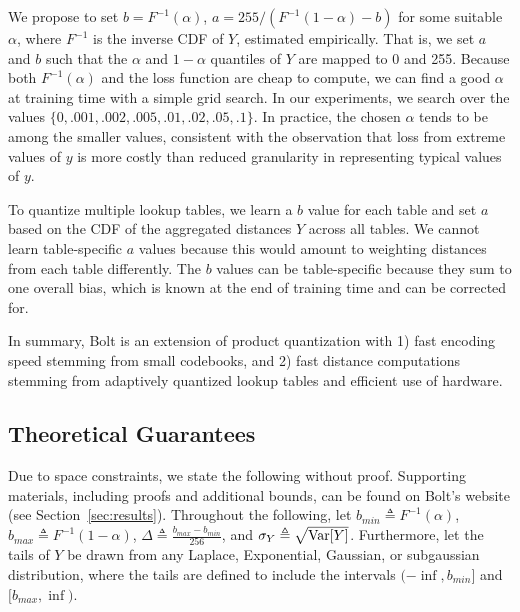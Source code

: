 We propose to set $b = F^{-1}(\alpha)$, $a = 255 / (F^{-1}(1 - \alpha) - b)$ for some suitable $\alpha$, where $F^{-1}$ is the inverse CDF of $Y$, estimated empirically. That is, we set $a$ and $b$ such that the $\alpha$ and $1 - \alpha$ quantiles of $Y$ are mapped to 0 and 255. Because both $F^{-1}(\alpha)$ and the loss function are cheap to compute, we can find a good $\alpha$ at training time with a simple grid search. In our experiments, we search over the values $\{0, .001, .002, .005, .01, .02, .05, .1\}$. In practice, the chosen $\alpha$ tends to be among the smaller values, consistent with the observation that loss from extreme values of $y$ is more costly than reduced granularity in representing typical values of $y$.

To quantize multiple lookup tables, we learn a $b$ value for each table and set $a$ based on the CDF of the aggregated distances $Y$ across all tables. We cannot learn table-specific $a$ values because this would amount to weighting distances from each table differently. The $b$ values can be table-specific because they sum to one overall bias, which is known at the end of training time and can be corrected for.


In summary, Bolt is an extension of product quantization with 1) fast encoding speed stemming from small codebooks, and 2) fast distance computations stemming from adaptively quantized lookup tables and efficient use of hardware.

\subsection{Theoretical Guarantees}

Due to space constraints, we state the following without proof. Supporting materials, including proofs and additional bounds, can be found on Bolt's website (see Section~\ref{sec:results}). %
Throughout the following, let $b_{min} \triangleq F^{-1}(\alpha)$, $b_{max} \triangleq F^{-1}(1 - \alpha)$, $\Delta \triangleq \frac{b_{max} - b_{min} }{ 256 }$, and $\sigma_Y \triangleq \sqrt{\operatorname{Var}[Y]}$. Furthermore, let the tails of $Y$ be drawn from any Laplace, Exponential, Gaussian, or subgaussian distribution, where the tails are defined to include the intervals $(-\inf, b_{min}]$ and $[b_{max}, \inf)$.

